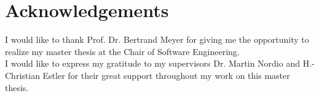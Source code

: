 


\chapter*{Acknowledgements}

I would like to thank Prof. Dr. Bertrand Meyer for giving me the opportunity to realize my master thesis at the Chair of Software Engineering. \\

I would like to express my gratitude to my supervisors Dr. Martin Nordio and H.-Christian Estler for their great support throughout my work on this master thesis.



